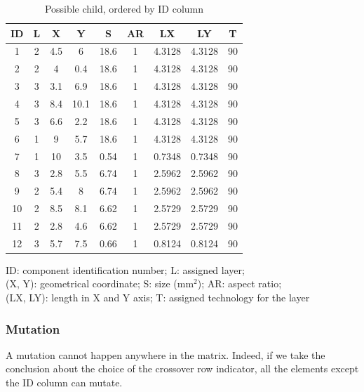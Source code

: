 \begin{table}[h!]
\caption{Possible child, ordered by ID column}
\begin{center}
\begin{scriptsize}
\begin{tabular}{|c|c|c|c|c|c|c|c|c|}
\hline ID & L & X & Y & S & AR & LX & LY & T\\
\hline 1 & 2 & 4.5 & 6 & 18.6 & 1 & 4.3128 & 4.3128 & 90\\
2 & 2 & 4 & 0.4 & 18.6 & 1 & 4.3128 & 4.3128 & 90\\
3 & 3 & 3.1 & 6.9 & 18.6 & 1 & 4.3128 & 4.3128 & 90\\
4 & 3 & 8.4 & 10.1 & 18.6 & 1 & 4.3128 & 4.3128 & 90\\
5 & 3 & 6.6 & 2.2 & 18.6 & 1 & 4.3128 & 4.3128 & 90\\
6 & 1 & 9 & 5.7 & 18.6 & 1 & 4.3128 & 4.3128 & 90\\
7 & 1 & 10 & 3.5 & 0.54 & 1 & 0.7348 & 0.7348 & 90\\
8 & 3 & 2.8 & 5.5 & 6.74 & 1 & 2.5962 & 2.5962 & 90\\
9 & 2 & 5.4 & 8 & 6.74 & 1 & 2.5962 & 2.5962 & 90\\
10 & 2 & 8.5 & 8.1 & 6.62 & 1 & 2.5729 & 2.5729 & 90\\
11 & 2 & 2.8 & 4.6 & 6.62 & 1 & 2.5729 & 2.5729 & 90\\
12 & 3 & 5.7 & 7.5 & 0.66 & 1 & 0.8124 & 0.8124 & 90\\
\hline
\end{tabular}
\end{scriptsize}
\end{center}
\begin{center}
\begin{scriptsize}
ID: component identification number; L: assigned layer;\\
(X, Y): geometrical coordinate; S: size (mm$^2$); AR: aspect ratio;\\
(LX, LY): length in X and Y axis; T: assigned technology for the layer
\end{scriptsize}
\end{center}
\label{tab:childIDrow}
\end{table}

\subsubsection{Mutation}
A mutation cannot happen anywhere in the matrix. Indeed, if we take the conclusion about the choice of the crossover row indicator, all the elements except the ID column can mutate.

